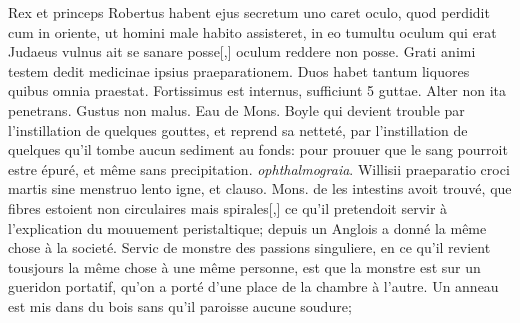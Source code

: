 \pend%
\pstart%
Rex et princeps Robertus\protect{} habent ejus secretum
uno caret oculo, quod perdidit cum in oriente, ut
homini male habito assisteret, in eo tumultu oculum
qui erat Judaeus vulnus ait se sanare posse[,]
 oculum reddere non posse. Grati animi testem dedit medicinae ipsius praeparationem. Duos habet tantum liquores quibus omnia praestat. Fortissimus est internus, sufficiunt 5 guttae. Alter non ita penetrans. Gustus non malus.
\pend%
\pstart%
Eau 
de Mons. Boyle\protect{}
qui devient trouble par l'instillation de quelques gouttes, et reprend sa nettet\'{e}, par l'instillation de quelques
qu'il tombe aucun sediment au fonds: pour prouuer que le sang pourroit estre \'{e}pur\'{e},
et m\^{e}me sans precipitation.
\pend%
\pstart%
 \textit{ophthalmograia}.\protect{}
\pend%
\pstart%
Willisii\protect{} praeparatio croci martis\protect{} sine menstruo\protect{} lento igne, et clauso.
\pend%
\pstart%
Mons. de\protect{}
les intestins avoit trouv\'{e}, que
 fibres es\-toi\-ent non circulaires mais spirales[,] ce qu'il pretendoit servir \`{a} l'explication du mouuement peristaltique\protect{}; depuis un Anglois a donn\'{e} la m\^{e}me chose \`{a} la societ\'{e}.
\pend
\newpage
\pstart%
Servic de monstre des passions singuliere, en ce qu'il revient tousjours la m\^{e}me chose \`{a} une m\^{e}me personne, est que la monstre est sur un gueridon portatif, qu'on a port\'{e} d'une place de la chambre \`{a} l'autre. Un anneau est mis dans du bois sans qu'il paroisse aucune soudure;
